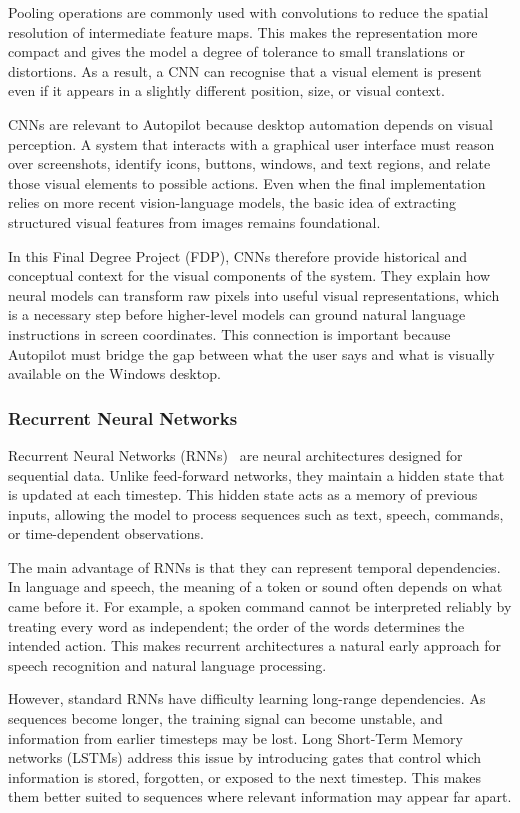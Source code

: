 Pooling operations are commonly used with convolutions to reduce the spatial resolution of intermediate feature maps. This makes the representation more compact and gives the model a degree of tolerance to small translations or distortions. As a result, a CNN can recognise that a visual element is present even if it appears in a slightly different position, size, or visual context.

CNNs are relevant to Autopilot because desktop automation depends on visual perception. A system that interacts with a graphical user interface must reason over screenshots, identify icons, buttons, windows, and text regions, and relate those visual elements to possible actions. Even when the final implementation relies on more recent vision-language models, the basic idea of extracting structured visual features from images remains foundational.

In this Final Degree Project (FDP), CNNs therefore provide historical and conceptual context for the visual components of the system. They explain how neural models can transform raw pixels into useful visual representations, which is a necessary step before higher-level models can ground natural language instructions in screen coordinates. This connection is important because Autopilot must bridge the gap between what the user says and what is visually available on the Windows desktop.

\subsubsection{Recurrent Neural Networks}

Recurrent Neural Networks (RNNs)~\cite{Elman1990} are neural architectures designed for sequential data. Unlike feed-forward networks, they maintain a hidden state that is updated at each timestep. This hidden state acts as a memory of previous inputs, allowing the model to process sequences such as text, speech, commands, or time-dependent observations.

The main advantage of RNNs is that they can represent temporal dependencies. In language and speech, the meaning of a token or sound often depends on what came before it. For example, a spoken command cannot be interpreted reliably by treating every word as independent; the order of the words determines the intended action. This makes recurrent architectures a natural early approach for speech recognition and natural language processing.

However, standard RNNs have difficulty learning long-range dependencies. As sequences become longer, the training signal can become unstable, and information from earlier timesteps may be lost. Long Short-Term Memory networks (LSTMs) \cite{Hochreiter1997} address this issue by introducing gates that control which information is stored, forgotten, or exposed to the next timestep. This makes them better suited to sequences where relevant information may appear far apart.

